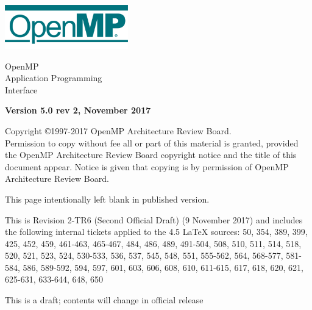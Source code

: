 
  \begin{titlepage}
    \begin{flushleft}
     \hspace{-6em} \includegraphics[width=0.4\textwidth]{openmp-logo.png}
    \end{flushleft}

    \begin{adjustwidth}{-0.75in}{0in}
    \begin{center}
      \Huge
      \textsf{OpenMP\\Application Programming\\Interface}

      \vspace{0.5in}\textsf{    }\vspace{-0.7in}
      \normalsize

      \vspace{1.0in}

      \textbf{Version 5.0 rev 2, November 2017}
    \end{center}
    \end{adjustwidth}

    \vspace{3.0in}

\begin{adjustwidth}{0pt}{1em}\setlength{\parskip}{0.25\baselineskip}%
Copyright \copyright 1997-2017 OpenMP Architecture Review Board.\\
Permission to copy without fee all or part of this material is granted,
provided the OpenMP Architecture Review Board copyright notice and
the title of this document appear. Notice is given that copying is by
permission of OpenMP Architecture Review Board.\end{adjustwidth}

  \end{titlepage}


\clearpage
\thispagestyle{empty}
\phantom{a}
This page intentionally left blank in published version.

This is Revision 2-TR6 (Second Official Draft) (9 November 2017) and 
includes the following internal tickets applied to the 4.5 LaTeX sources: 
50, 354, 389, 399, 425, 452, 459, 461-463, 465-467, 484, 486, 489, 491-504, 
508, 510, 511, 514, 518, 520, 521, 523, 524, 530-533, 536, 537, 545, 548, 
551, 555-562, 564, 568-577, 581-584, 586, 589-592, 594, 597, 601, 603, 606, 
608, 610, 611-615, 617, 618, 620, 621, 625-631, 633-644, 648, 650

This is a draft; contents will change in official release

\vfill

